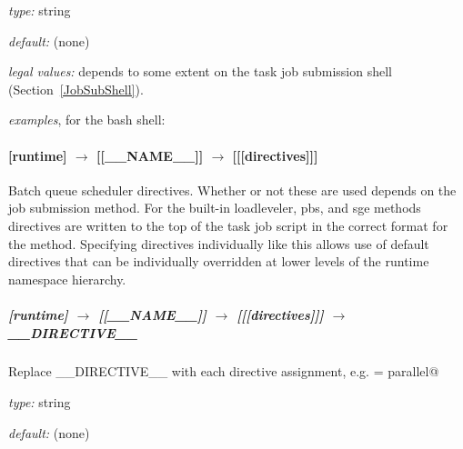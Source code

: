 \begin{myitemize}
\item {\em type:} string
\item {\em default:} (none)
\item {\em legal values:} depends to some extent on the task job
    submission shell (Section~\ref{JobSubShell}). 
\item {\em examples}, for the bash shell: 
\end{myitemize}

\paragraph[{[[[}directives{]]]}]{[runtime] $\rightarrow$ [[\_\_NAME\_\_]] $\rightarrow$ [[[directives]]]}

Batch queue scheduler directives.  Whether or not these are used depends
on the job submission method. For the built-in loadleveler, pbs, and sge
methods directives are written to the top of the task job script in
the correct format for the method. Specifying directives individually
like this allows use of default directives that can be individually
overridden at lower levels of the runtime namespace hierarchy.

\subparagraph[\_\_DIRECTIVE\_\_ ]{[runtime] $\rightarrow$ [[\_\_NAME\_\_]] $\rightarrow$ [[[directives]]] $\rightarrow$ \_\_DIRECTIVE\_\_}

Replace \_\_DIRECTIVE\_\_ with each directive assignment, e.g. 
\lstinline@class = parallel@

\begin{myitemize}
\item {\em type:} string
\item {\em default:} (none)
\end{myitemize}

